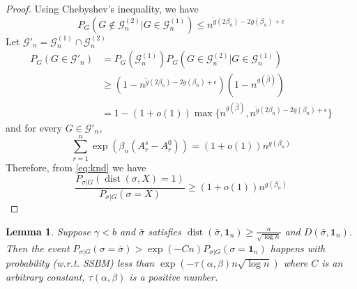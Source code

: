\documentclass[journal]{IEEEtran}
\newtheorem{lemma}{Lemma}
\newcommand{\cG}{\mathcal{G}}
\newcommand{\1}{\mathbbm{1}}
\DeclareMathOperator{\dist}{dist}
\begin{document}
\begin{proof}
Using Chebyshev's inequality, we have
\begin{equation*}
P_G(G \not\in \cG^{(2)}_n \Big\vert  G \in \cG^{(1)}_n) \leq n^{\tilde{g}(2\beta_n) - 2g(\beta_n) + \epsilon}
\end{equation*}
Let $\cG'_n = \cG^{(1)}_n \cap \cG^{(2)}_n$
\begin{align*}
P_G(G \in \cG'_n) &= P_G(\cG^{(1)}_n) P_G(G \in \cG_n^{(2)} | G \in \cG_n^{(1)}) \\
& \geq (1-n^{\tilde{g}(2\beta_n) - 2g(\beta_n) + \epsilon})(1-n^{g(\bar{\beta})}) \\
&= 1-(1+o(1))\max\{n^{g(\bar{\beta})}, n^{\tilde{g}(2\beta_n) - 2g(\beta_n) + \epsilon} \}
\end{align*}
and for every $G\in\cG'_n$,
\begin{equation*}
\sum_{r=1}^n \exp(\beta_n (A_r^s - A_r^0)) = (1+o(1)) n^{g(\beta_n)}
\end{equation*}
Therefore, from \eqref{eq:knd} we have
\begin{equation*}
	\frac{P_{\sigma|G}(\dist(\sigma, X)=1)}
{P_{\sigma|G}(\sigma=X)} \geq (1+o(1)) n^{g(\beta_n)}
\end{equation*}
\end{proof}
\begin{lemma}\label{lem:small}
	Suppose $\gamma < b $ and $\bar{\sigma}$ satisfies $\dist(\bar{\sigma}, \mathbf{1}_n) \geq \frac{n}{\sqrt{\log  n}}$
	and $D(\bar{\sigma}, \mathbf{1}_n)$.
	Then the event
	$P_{\sigma | G}(\sigma = \bar{\sigma} ) > \exp(-Cn) P_{\sigma | G}(\sigma = \mathbf{1}_n)$
	happens with probability (w.r.t. SSBM) less than $\exp(-\tau(\alpha,\beta) n \sqrt{\log  n} )$ where $C$ is an arbitrary constant, $\tau(\alpha,\beta)$ is a positive number.
\end{lemma}
\end{document}
